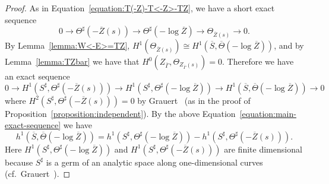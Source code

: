 \documentclass[a4paper, reqno, twoside]{amsart}
\theoremstyle{definition}
\numberwithin{equation}{section}
\begin{document}
\begin{proof}
As in Equation~\eqref{equation:T(-Z)-T<-Z>-TZ}, we have a short exact
sequence
\begin{equation*}
0 \to \Theta^{\sharp}(-\overline{Z}(s)) \to \Theta^{\sharp}(-\log{\overline{Z}}) \to \Theta_{\overline{Z}(s)} \to 0.
\end{equation*}
By Lemma~\ref{lemma:W<-E>=TZ}, $H^1(\Theta_{\overline{Z}(s)}) \cong H^1(\overline{S}, \overline{\Theta}(-\log{\overline{Z}}))$, and by
Lemma~\ref{lemma:TZbar} we have that $H^0(Z_{\overline{\Gamma}}, \Theta_{Z_{\overline{\Gamma}}(s)})=0$. Therefore we have an exact sequence
    \begin{equation}\label{equation:main-exact-sequence}
    0 \to H^1(S^{\sharp}, \Theta^{\sharp}(-\overline{Z}(s))) \to
    H^1(S^{\sharp}, \Theta^{\sharp}(-\log{\overline{Z}})) \to
    H^1(\overline{S}, \overline{\Theta}(-\log{\overline{Z}})) \to 0
    \end{equation}
where $H^2(S^{\sharp}, \Theta^{\sharp}(-\overline{Z}(s)))=0$ by
Grauert~\cite[Satz 1, p.~355]{Grauert-1962} (as in the proof of
Proposition~\ref{proposition:independent}). By the above
Equation~\eqref{equation:main-exact-sequence} we have
\begin{equation}\label{equation:first-reduction}
h^1(\overline{S}, \overline{\Theta}(-\log{\overline{Z}}))
= h^1(S^{\sharp}, \Theta^{\sharp}(-\log{\overline{Z}}))
-h^1(S^{\sharp}, \Theta^{\sharp}(-\overline{Z}(s))).
\end{equation}
Here $H^1(S^{\sharp}, \Theta^{\sharp}(-\log{\overline{Z}}))$ and $H^1(S^{\sharp}, \Theta^{\sharp}(-\overline{Z}(s)))$ are finite dimensional because $S^{\sharp}$ is a germ of an analytic space along one-dimensional curves (cf.\ Grauert~\cite[Satz 1, p.~355]{Grauert-1962}).


\end{proof}
\end{document}
